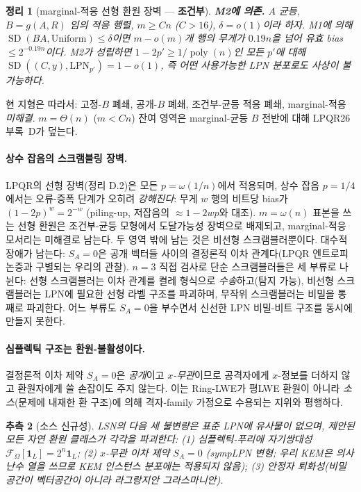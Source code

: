 \documentclass[11pt,a4paper]{article}
\theoremstyle{plain}
\newtheorem{theorem}{정리}[section]
\newtheorem{conjecture}[theorem]{추측}
\theoremstyle{definition}
\begin{document}
\begin{theorem}[marginal-적응 선형 환원 장벽 --- \textbf{조건부}]
\textbf{M2에 의존.} $A$ 균등, $B = g(A,R)$ 임의 적응 행렬, $m \ge Cn$ ($C > 16$), $\delta = o(1)$이라 하자. M1에 의해 $\operatorname{SD}(BA,\mathrm{Uniform}) \le \delta$이면 $m - o(m)$개 행의 무게가 $0.19n$을 넘어 유효 bias $\le 2^{-0.19n}$이다. M2가 성립하면 $1-2p'\ge 1/\operatorname{poly}(n)$인 모든 $p'$에 대해 $\operatorname{SD}((C,y),\mathrm{LPN}_{p'})=1-o(1)$, 즉 어떤 사용가능한 LPN 분포로도 사상이 불가능하다.
\end{theorem}

현 지형은 따라서: 고정-$B$ 폐쇄, 공개-$B$ 폐쇄, 조건부-균등 적응 폐쇄, marginal-적응 \emph{미해결}. $m = \Theta(n)$ ($m < Cn$) 잔여 영역은 marginal-균등 $B$ 전반에 대해 LPQR26 부록~D가 덮는다.

\paragraph{상수 잡음의 스크램블링 장벽.} LPQR의 선형 장벽(정리 D.2)은 모든 $p = \omega(1/n)$에서 적용되며, 상수 잡음 $p=1/4$에서는 오류-증폭 단계가 오히려 \emph{강해진다}: 무게 $w$ 행의 비트당 bias가 $(1-2p)^w = 2^{-w}$ (piling-up, 저잡음의 $\approx 1-2wp$와 대조). $m=\omega(n)$ 표본을 쓰는 선형 환원은 조건부-균등 모형에서 도달가능성 장벽으로 배제되고, marginal-적응 모서리는 미해결로 남는다. 두 영역 밖에 남는 것은 비선형 스크램블러뿐이다. 대수적 장애가 남는다: $S_A = 0$은 공개 벡터들 사이의 결정론적 이차 관계다(LPQR 엔트로피 논증과 구별되는 우리의 관찰). $n=3$ 직접 검사로 단순 스크램블러들은 세 부류로 나뉜다: 선형 스크램블러는 이차 관계를 켤레 형식으로 \emph{수송}하고(탐지 가능), 비선형 스크램블러는 LPN에 필요한 선형 라벨 구조를 파괴하며, 무작위 스크램블러는 비밀을 통째로 파괴한다. 어느 부류도 $S_A=0$을 부수면서 신선한 LPN 비밀-비트 구조를 동시에 만들지 못한다.

\paragraph{심플렉틱 구조는 환원-불활성이다.} 결정론적 이차 제약 $S_A = 0$은 \emph{공개}이고 \emph{$x$-무관}이므로 공격자에게 $x$-정보를 더하지 않고 환원자에게 쓸 손잡이도 주지 않는다. 이는 Ring-LWE가 평LWE 환원이 아니라 \emph{소스}(문제에 내재한 환 구조)에 의해 격자-family 가정으로 수용되는 지위와 평행하다.

\begin{conjecture}[소스 신규성]
LSN의 다음 세 불변량은 표준 LPN에 유사물이 없으며, 제안된 모든 자연 환원 클래스가 각각을 파괴한다: (1) 심플렉틱-푸리에 자기쌍대성 $\mathcal{F}_\Omega[\mathbf{1}_L] = 2^n\mathbf{1}_L$; (2) $x$-무관 이차 제약 $S_A=0$ (sympLPN 변형; 우리 KEM은 의사난수 열을 쓰므로 KEM 인스턴스 분포에는 적용되지 않음); (3) 안정자 퇴화성(비밀 공간이 벡터공간이 아니라 라그랑지안 그라스마니안).
\end{conjecture}
\end{document}
